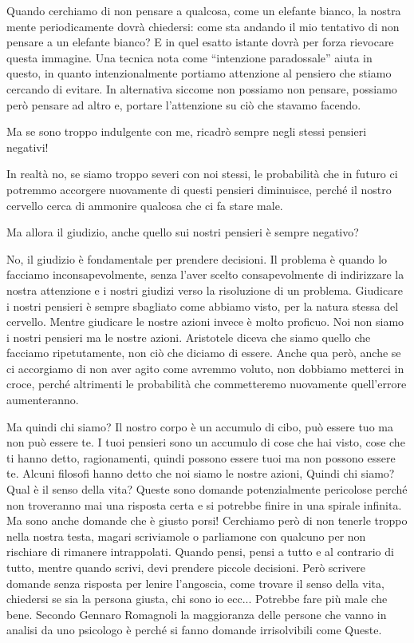 \documentclass[12pt]{book} %
\begin{document}
Quando cerchiamo di non pensare a qualcosa, come un elefante bianco, la nostra mente periodicamente dovrà chiedersi:
come sta andando il mio tentativo di non pensare a un elefante bianco? E in quel esatto istante dovrà per forza
rievocare questa immagine. Una tecnica nota come “intenzione paradossale” aiuta in questo, in quanto intenzionalmente
portiamo attenzione al pensiero che stiamo cercando di evitare. In alternativa siccome non possiamo non pensare,
possiamo però pensare ad altro e, portare l'attenzione su ciò che stavamo facendo. 

Ma se sono troppo indulgente con me, ricadrò sempre negli stessi pensieri negativi! 

In realtà no, se siamo troppo severi con noi stessi, le probabilità che in futuro ci potremmo accorgere nuovamente di
questi pensieri diminuisce, perché il nostro cervello cerca di ammonire qualcosa che ci fa stare male. 

Ma allora il giudizio, anche quello sui nostri pensieri è sempre negativo?

No, il giudizio è fondamentale per prendere decisioni. Il problema è quando lo facciamo inconsapevolmente, senza
l'aver scelto consapevolmente di indirizzare la nostra attenzione e i nostri giudizi verso la
risoluzione di un problema. Giudicare i nostri pensieri è sempre sbagliato come abbiamo visto, per la natura stessa del
cervello. Mentre giudicare le nostre azioni invece è molto proficuo. Noi non siamo i nostri pensieri ma le nostre
azioni. Aristotele diceva che siamo quello che facciamo ripetutamente, non ciò che diciamo di essere. Anche qua però, anche se ci accorgiamo di non aver agito come avremmo voluto, non dobbiamo metterci in croce, perché altrimenti le probabilità che commetteremo nuovamente quell'errore aumenteranno. 

Ma quindi chi siamo? Il nostro corpo è un accumulo di cibo, può essere tuo ma non può essere te. I tuoi pensieri sono un
accumulo di cose che hai visto, cose che ti hanno detto, ragionamenti, quindi possono essere tuoi ma non possono essere
te. Alcuni filosofi hanno detto che noi siamo le nostre azioni, Quindi chi siamo? Qual è il senso della vita? Queste sono domande
potenzialmente pericolose perché non troveranno mai una risposta certa e si potrebbe finire in una spirale infinita. Ma
sono anche domande che è giusto porsi! Cerchiamo però di non tenerle troppo nella nostra testa, magari scriviamole o
parliamone con qualcuno per non rischiare di rimanere intrappolati. Quando pensi, pensi a tutto e al contrario di tutto, mentre quando scrivi, devi prendere piccole decisioni. Però scrivere domande senza risposta per lenire l'angoscia, come trovare il senso della vita, chiedersi se sia la persona giusta, chi sono io ecc... Potrebbe fare più male che bene. 
Secondo Gennaro Romagnoli la maggioranza delle persone che vanno in analisi da uno psicologo è perché si fanno domande irrisolvibili come Queste.
\end{document}
